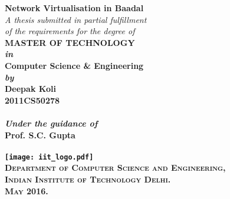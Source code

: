 \begin{titlepage}
\begin{center}

\LARGE{\textsf{\bfseries Network Virtualisation in Baadal}}\\
\vspace{20pt}
\normalsize
\emph{A thesis submitted in partial fulfillment} \\
\emph{of the requirements for the degree of} \\
\vspace{20pt}
\bfseries MASTER OF TECHNOLOGY \\
\vspace{20pt}
\emph {in}\\
\vspace{20pt}
\bfseries Computer Science \& Engineering \\
\vspace{20pt}
\emph {by}\\
\vspace{20pt}
\Large{\textsf{\bfseries Deepak Koli}} \\
{\normalsize \textsf{\bfseries 2011CS50278}}\\
\ \\
{\normalsize \emph {Under the guidance of}}
\ \\
\Large{\textsf{\bfseries Prof. S.C. Gupta}} \\
\ \\
\vspace{30pt}
\texttt{[image: iit\_logo.pdf]} \\
\vspace{10pt}
\large{\textsc{Department of Computer Science and Engineering,\\
Indian Institute of Technology Delhi.\\ May 2016.}}
\end{center}
\end{titlepage}
